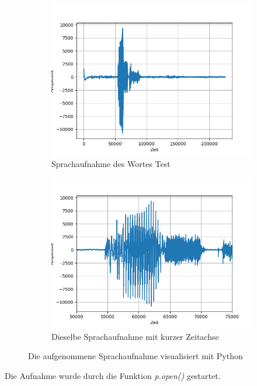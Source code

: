 \documentclass[12pt, oneside, a4paper, \docLanguage]{report}
\begin{document}
\begin{figure}[hbt!]
\centering
	\begin{subfigure}{.5\textwidth}
  		\centering
 		 \includegraphics[width=.95\linewidth]{../data/img/testamp.png}
  		\caption{Sprachaufnahme des Wortes Test}
 		 \label{fig:sub1}
	\end{subfigure}%
	\begin{subfigure}{.5\textwidth}
  		\centering
 		 \includegraphics[width=.95\linewidth]{../data/img/testamp2.png}
  		\caption{Dieselbe Sprachaufnahme mit kurzer Zeitachse}
  		\label{fig:sub2}
	\end{subfigure}
	\caption{Die aufgenommene Sprachaufnahme visualisiert mit Python}
	\label{fig:test}
\end{figure}
Die Aufnahme wurde durch die Funktion \textit{p.open()} gestartet. 
\end{document}
